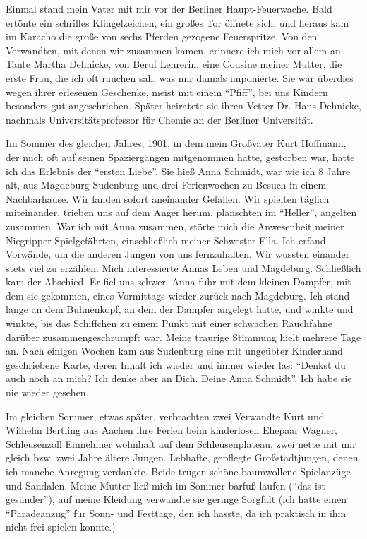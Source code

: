 \documentclass[a5paper,pagesize,10pt,twoside=true]{scrbook}
\begin{document}
Einmal stand mein Vater mit mir vor der Berliner Haupt-Feuerwache. Bald ertönte ein schrilles Klingelzeichen, ein großes Tor öffnete sich, und heraus kam im Karacho die große von sechs Pferden gezogene Feuerspritze. Von den Verwandten, mit denen wir zusammen kamen, erinnere ich mich vor allem an Tante Martha Dehnicke, von Beruf Lehrerin, eine Cousine meiner Mutter, die erste Frau, die ich oft rauchen sah, was mir damals imponierte. Sie war überdies wegen ihrer erlesenen Geschenke, meist mit einem \enquote{Pfiff}, bei uns Kindern besonders gut angeschrieben. Später heiratete sie ihren Vetter Dr. Hans Dehnicke, nachmals Universitätsprofessor für Chemie an der Berliner Universität.

Im Sommer des gleichen Jahres, 1901, in dem mein Großvater Kurt Hoffmann, der mich oft auf seinen Spaziergängen mitgenommen hatte, gestorben war, hatte ich das Erlebnis der \enquote{ersten Liebe}. Sie hieß Anna Schmidt, war wie ich 8 Jahre alt, aus Magdeburg-Sudenburg und drei Ferienwochen zu Besuch in einem Nachbarhause. Wir fanden sofort aneinander Gefallen. Wir spielten täglich miteinander, trieben uns auf dem Anger herum, planschten im \enquote{Heller}, angelten zusammen. War ich mit Anna zusammen, störte mich die Anwesenheit meiner Niegripper Spielgefährten, einschließlich meiner Schwester Ella. Ich erfand Vorwände, um die anderen Jungen von uns fernzuhalten. Wir wussten einander stets viel zu erzählen. Mich interessierte Annas Leben und Magdeburg. Schließlich kam der Abschied. Er fiel uns schwer. Anna fuhr mit dem kleinen Dampfer, mit dem sie gekommen, eines Vormittags wieder zurück nach Magdeburg. Ich stand lange an dem Buhnenkopf, an dem der Dampfer angelegt hatte, und winkte und winkte, bis das Schiffchen zu einem Punkt mit einer schwachen Rauchfahne darüber zusammengeschrumpft war. Meine traurige Stimmung hielt mehrere Tage an. Nach einigen Wochen kam aus Sudenburg eine mit ungeübter Kinderhand geschriebene Karte, deren Inhalt ich wieder und immer wieder las: \enquote{Denkst du auch noch an mich? Ich denke aber an Dich. Deine Anna Schmidt}. Ich habe sie nie wieder gesehen.

Im gleichen Sommer, etwas später, verbrachten zwei Verwandte Kurt und Wilhelm Bertling aus Aachen ihre Ferien beim kinderlosen Ehepaar Wagner, Schleusenzoll Einnehmer wohnhaft auf dem Schleusenplateau, zwei nette mit mir gleich bzw. zwei Jahre ältere Jungen. Lebhafte, gepflegte Großstadtjungen, denen ich manche Anregung verdankte. Beide trugen schöne baumwollene Spielanzüge und Sandalen. Meine Mutter ließ mich im Sommer barfuß laufen (\enquote{das ist gesünder}), auf meine Kleidung verwandte sie geringe Sorgfalt (ich hatte einen \enquote{Paradeanzug} für Sonn- und Festtage, den ich hasste, da ich praktisch in ihm nicht frei spielen konnte.)
\end{document}
